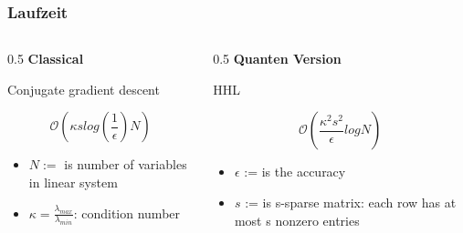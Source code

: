 \begin{frame}
    \frametitle{Laufzeit}
    \begin{columns}[c]
        \begin{column}{0.5\hsize}
            \textbf{Classical}

            \hfil

            Conjugate gradient descent 

            $$ \mathcal{O}(\kappa s log{\left(\frac 1 \epsilon\right)} N ) $$


            \hfil

            \begin{itemize}
            \item $N :=$ is number of variables in linear system
            \item $\kappa= \frac {\lambda_{max}} {\lambda_{min}}$:  condition number
            \end{itemize}

        \end{column}
        

        \begin{column}{0.5\hsize}
            \textbf{Quanten Version}

            \hfil

            HHL

            $$ \mathcal{O}(\frac{\kappa^2s^2}{\epsilon}logN) $$

            \hfil

            \begin{itemize}
            \item $\epsilon$ := is the accuracy                                                            
            \item $s$ := is s-sparse matrix: each row has at most s nonzero entries
            \end{itemize}

        \end{column}
    \end{columns}
 
    \hfil



\end{frame}


